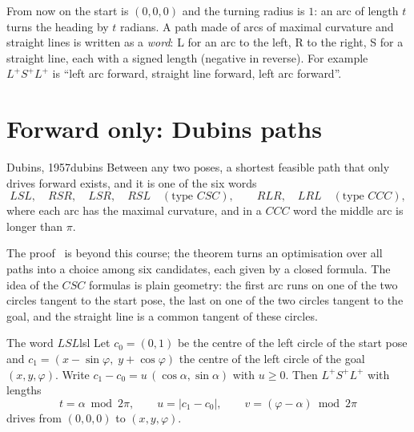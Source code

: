 From now on the start is $(0, 0, 0)$ and the turning radius is $1$: an arc
of length $t$ turns the heading by $t$ radians. A path made of arcs of
maximal curvature and straight lines is written as a \emph{word}: L for an
arc to the left, R to the right, S for a straight line, each with a signed
length (negative in reverse). For example $L^+ S^+ L^+$ is ``left arc
forward, straight line forward, left arc forward''.

\section{Forward only: Dubins paths}

\begin{theorem}{Dubins, 1957}{dubins}
  Between any two poses, a shortest feasible path that only drives forward
  exists, and it is one of the six words
  \[
    LSL,\quad RSR,\quad LSR,\quad RSL \quad (\text{type } CSC),
    \qquad RLR,\quad LRL \quad (\text{type } CCC),
  \]
  where each arc has the maximal curvature, and in a $CCC$ word the middle
  arc is longer than $\pi$.
\end{theorem}

The proof~\cite{dubins1957curves} is
beyond this course; the theorem turns an optimisation over all paths into a
choice among six candidates, each given by a closed formula. The idea of the
$CSC$ formulas is plain geometry: the first arc runs on one of the two
circles tangent to the start pose, the last on one of the two circles tangent
to the goal, and the straight line is a common tangent of these circles.

\begin{proposition}{The word $LSL$}{lsl}
  Let $c_0 = (0, 1)$ be the centre of the left circle of the start pose and
  $c_1 = (x - \sin\varphi,\; y + \cos\varphi)$ the centre of the left circle
  of the goal $(x, y, \varphi)$. Write $c_1 - c_0 = u\,(\cos\alpha,
  \sin\alpha)$ with $u \ge 0$. Then $L^+ S^+ L^+$ with lengths
  \[
    t = \alpha \bmod 2\pi, \qquad u = |c_1 - c_0|, \qquad
    v = (\varphi - \alpha) \bmod 2\pi
  \]
  drives from $(0, 0, 0)$ to $(x, y, \varphi)$.
\end{proposition}

